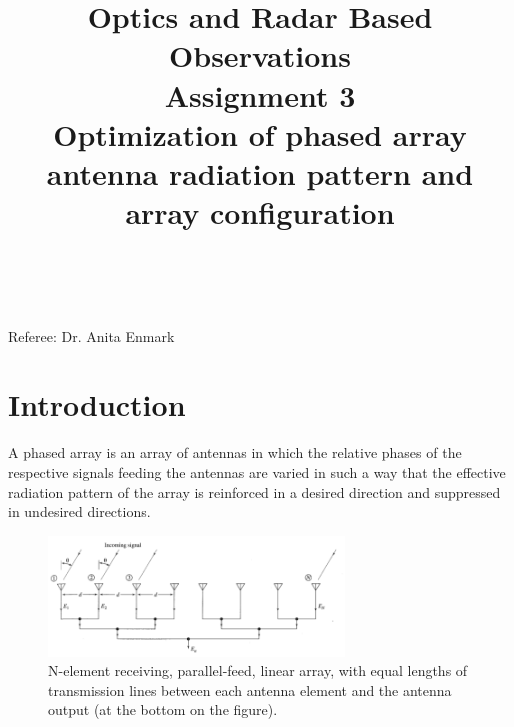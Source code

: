 \documentclass{article}
\title{\textbf {Optics and Radar Based Observations} \\ Assignment 3\\ Optimization of phased array antenna radiation pattern and array configuration} %
\author{\authorivan\\\authoranu}
\begin{document}
\maketitle %

\centerline{Referee: Dr. Anita Enmark}

\setlength\parindent{0pt} %

\renewcommand{\labelenumi}{\alph{enumi}.} %
\clearpage

\tableofcontents

\listoffigures

\clearpage


\section{Introduction}
A phased array is an array of antennas in which the relative phases of the respective signals feeding the antennas are varied in such a way that the effective radiation pattern of the array is reinforced in a desired direction and suppressed in undesired directions. \cite{Wiki:2012pa}\\

\begin{figure}[h!bt]
\centering
\includegraphics[width=0.7\textwidth]{Figures/phased_array.png}
\caption{N-element receiving, parallel-feed, linear array, with equal lengths of transmission lines between each antenna element and the antenna output (at the bottom on the figure).}
\label{fig:phased_array}
\end{figure}
\end{document}
